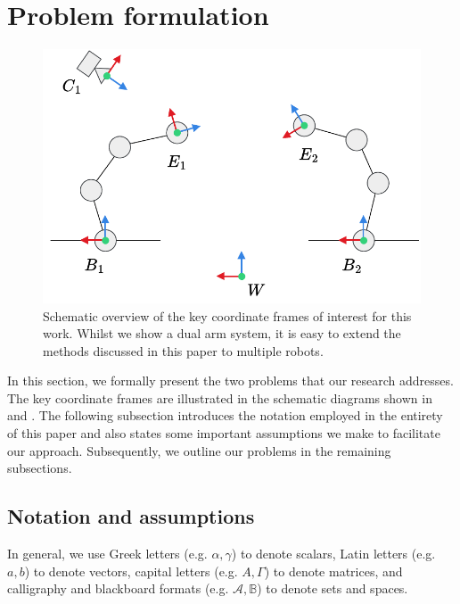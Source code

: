 \section{Problem formulation}
\begin{figure}[tb]
    \centering
    \includegraphics[width=\textwidth]{chapter_1/fig/eye_in_to_hand.pdf}
    \caption{
    Schematic overview of the key coordinate frames of interest for this work.
    Whilst we show a dual arm system, it is easy to extend the methods discussed in this paper to multiple robots.
    }
    \label{c1:fig:base2base}
\end{figure}

In this section, we formally present the two problems that our research addresses. 
The key coordinate frames are illustrated in the schematic diagrams shown in  and . 
The following subsection introduces the notation employed in the entirety of this paper and also states some important assumptions we make to facilitate our approach. 
Subsequently, we outline our problems in the remaining subsections.

\subsection{Notation and assumptions}

In general, we use 
Greek letters (e.g. $\alpha, \gamma$) to denote scalars, 
Latin letters (e.g. $a, b$) to denote vectors, 
capital letters (e.g. $A, \Gamma$) to denote matrices, and 
calligraphy and blackboard formats (e.g. $\mathcal{A}, \mathbb{B}$) to denote sets and spaces.

